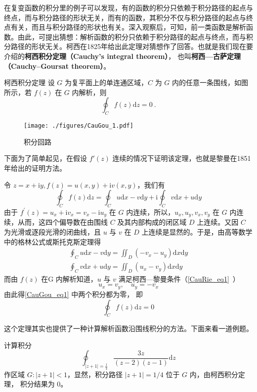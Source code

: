 


在复变函数的积分里的例子可以发现，有的函数的积分只依赖于积分路径的起点与终点，而与积分路径的形状无关，而有的函数，其积分不仅与积分路径的起点与终点有关，而且与积分路径的形状也有关。深入观察后，可知，前一类函数是解析函数。由此，可提出猜想：解析函数的积分只依赖于积分路径的起点与终点，而与积分路径的形状无关。柯西在1825年给出此定理对猜想作了回答。也就是我们现在要介绍的\textbf{柯西积分定理（Cauchy's integral theorem）}， 也叫\textbf{柯西—古萨定理（Cauchy–Goursat theorem）}。

\begin{theorem}{柯西积分定理}
设 $G $ 为复平面上的单连通区域，$C $ 为 $G $ 内的任意一条围线，如图所示，若 $f (z)$ 在 $G $ 内解析，则
\begin{equation}
\oint_{C} f(z) \mathrm{d} z=0~.
\end{equation}
\begin{figure}[ht]
\centering
\texttt{[image: ./figures/CauGou\_1.pdf]}
\caption{积分回路} \label{CauGou_fig1}
\end{figure}

下面为了简单起见，在假设 $f'(z)$ 连续的情况下证明该定理，也就是黎曼在1851年给出的证明方法。

令 $z=x+\mathrm{i} y, f(z)=u(x, y)+\mathrm{i} v(x, y)$，我们有
\begin{equation}
\oint_{C} f(z) \mathrm{d} z=\oint_{C} u \mathrm{d} x-v \mathrm{d} y+\mathrm{i} \oint_{C} v \mathrm{d} x+u \mathrm{d} y
\end{equation}
由于 $f^{\prime}(z)=u_{x}+\mathrm{i} v_{x}=v_{x}-\mathrm{i} u_{y}$ 在 $G $ 内连续，所以，$u_{x}, u_{y}, v_{x}, v_{y}$ 在 $G $ 内连续，从而，这四个偏导数在由围线 $C$ 及其内部构成的闭区域 $D $ 上连续。又因 $C $ 为光滑或逐段光滑的闭曲线，且 $u $ 与 $v $ 在 $D $ 上连续是显然的。于是，由高等数学中的格林公式或斯托克斯定理得
\begin{equation}\label{CauGou_eq1}
\begin{aligned}\oint_C u \mathrm{d} x-v \mathrm{d} y=\iint_{D}\left(-v_{x}-u_{y}\right) \mathrm{d} x \mathrm{d} y \\ \oint_C v \mathrm{d} x+u \mathrm{d} y=\iint_{D}\left(u_{x}-v_{y}\right) \mathrm{d} x \mathrm{d} y\end{aligned}
\end{equation}
而由 $ f (z)$ 在G 内解析知道，$u$ 与 $v$ 满足柯西—黎曼条件（\autoref{CauRie_eq1}~）
\begin{equation}
u_{x}=v_{y}, \quad u_{y}=-v_{x}
\end{equation}
由此得\autoref{CauGou_eq1} 中两个积分都为零， 即
\begin{equation}
\oint_{C} f(z) \mathrm{d} z=0
\end{equation}
\end{theorem}
这个定理其实也提供了一种计算解析函数沿围线积分的方法。下面来看一道例题。
\begin{example}{}
计算积分
\begin{equation}
\oint_{|z+1|=\frac{1}{4}} \frac{3 z}{(z-2)(z-1)} \mathrm{d} z
\end{equation}
作区域 $G:|z+1|<1$，显然，积分路径 $|z+1|=1/4$ 位于 $G$ 内，由柯西积分定理， 积分结果为 0。
\end{example}
